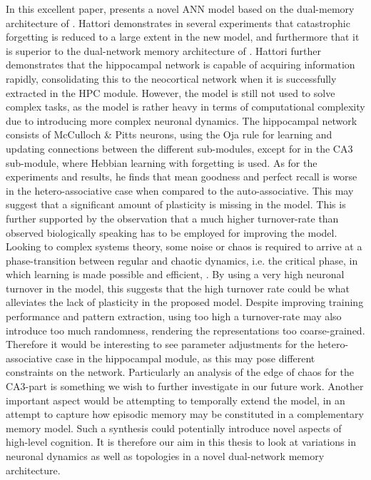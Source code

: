 In this excellent paper, \cite{Hattori2014} presents a novel ANN model based on the dual-memory architecture of \cite{McClelland1995}. Hattori demonstrates in several experiments that catastrophic forgetting is reduced to a large extent in the new model, and furthermore that it is superior to the dual-network memory architecture of \cite{Ans1997, French1997, Hattori2010}. Hattori further demonstrates that the hippocampal network is capable of acquiring information rapidly, consolidating this to the neocortical network when it is successfully extracted in the HPC module.
However, the model is still not used to solve complex tasks, as the model is rather heavy in terms of computational complexity due to introducing more complex neuronal dynamics. The hippocampal network consists of McCulloch \& Pitts neurons, using the Oja rule for learning and updating connections between the different sub-modules, except for in the CA3 sub-module, where Hebbian learning with forgetting is used.
As for the experiments and results, he finds that mean goodness and perfect recall is worse in the hetero-associative case when compared to the auto-associative. This may suggest that a significant amount of plasticity is missing in the model. This is further supported by the observation that a much higher turnover-rate than observed biologically speaking has to be employed for improving the model. Looking to complex systems theory, some noise or chaos is required to arrive at a phase-transition between regular and chaotic dynamics, i.e. the critical phase, in which learning is made possible and efficient, \cite{Langton1990, Newman2003}. By using a very high neuronal turnover in the model, this suggests that the high turnover rate could be what alleviates the lack of plasticity in the proposed model. Despite improving training performance and pattern extraction, using too high a turnover-rate may also introduce too much randomness, rendering the representations too coarse-grained. Therefore it would be interesting to see parameter adjustments for the hetero-associative case in the hippocampal module, as this may pose different constraints on the network. Particularly an analysis of the edge of chaos for the CA3-part is something we wish to further investigate in our future work. Another important aspect would be attempting to temporally extend the model, in an attempt to capture how episodic memory may be constituted in a complementary memory model. Such a synthesis could potentially introduce novel aspects of high-level cognition. It is therefore our aim in this thesis to look at variations in neuronal dynamics as well as topologies in a novel dual-network memory architecture.

